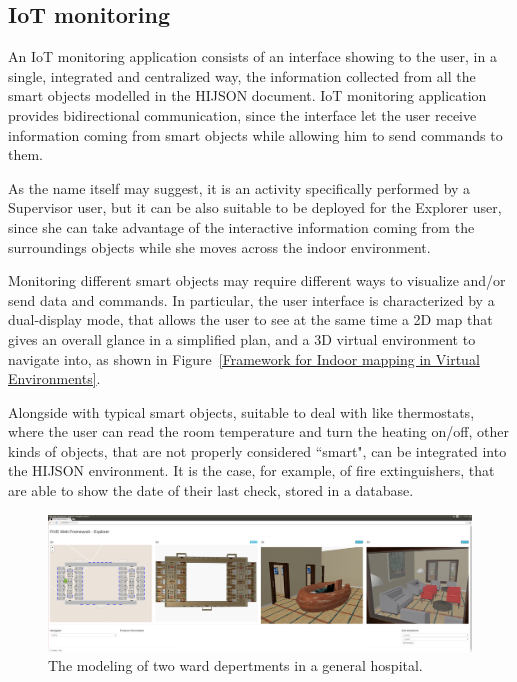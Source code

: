 \documentclass[]{egpubl}
\begin{document}
\subsection{IoT monitoring}

An IoT monitoring application consists of an interface showing to the user, in
a single, integrated and centralized way, the information collected from all
the smart objects modelled in the HIJSON document. IoT monitoring application
provides bidirectional communication, since the interface let the user receive
information coming from smart objects while allowing him to send commands to
them.

As the name itself may suggest, it is an activity specifically performed by a
Supervisor user, but it can be also suitable to be deployed for the Explorer
user, since she can take advantage of the interactive information coming from
the surroundings objects while she moves across the indoor environment.

Monitoring different smart objects may require different ways to visualize
and/or send data and commands. In particular, the user interface is
characterized by a dual-display mode, that allows the user to see at the same
time a 2D map that gives an overall glance in a simplified plan, and a 3D
virtual environment to navigate into, as shown in Figure~\ref{Framework for Indoor mapping in Virtual Environments}.

Alongside with typical smart objects, suitable to deal with like thermostats,
where the user can read the room temperature and turn the heating on/off,
other kinds of objects, that are not properly considered ``smart", can be
integrated into the HIJSON environment. It is the case, for example, of fire
extinguishers, that are able to show the date of their last check, stored in a
database.

\begin{figure}[htbp] %
   \centering
   \includegraphics[width=\textwidth]{images/ward2} 
   \caption{The modeling of two ward depertments in a general hospital.}
   \label{fig:example}
\end{figure}
\end{document}
